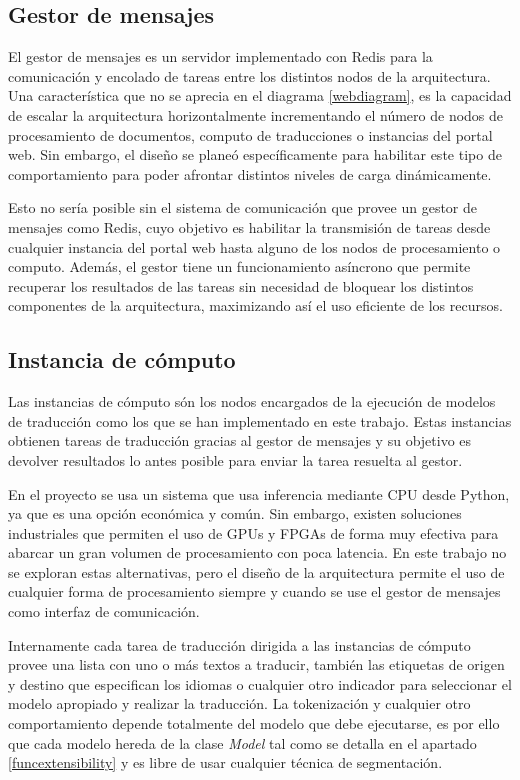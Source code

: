 \subsection{Gestor de mensajes}
El gestor de mensajes es un servidor implementado con Redis para la comunicación y encolado de tareas entre los distintos nodos de la arquitectura. Una característica que no se aprecia en el diagrama \ref{webdiagram}, es la capacidad de escalar la arquitectura horizontalmente incrementando el número de nodos de procesamiento de documentos, computo de traducciones o instancias del portal web. Sin embargo, el diseño se planeó específicamente para habilitar este tipo de comportamiento para poder afrontar distintos niveles de carga dinámicamente.

Esto no sería posible sin el sistema de comunicación que provee un gestor de mensajes como Redis, cuyo objetivo es habilitar la transmisión de tareas desde cualquier instancia del portal web hasta alguno de los nodos de procesamiento o computo. Además, el gestor tiene un funcionamiento asíncrono que permite recuperar los resultados de las tareas sin necesidad de bloquear los distintos componentes de la arquitectura, maximizando así el uso eficiente de los recursos.

\subsection{Instancia de cómputo}
Las instancias de cómputo són los nodos encargados de la ejecución de modelos de traducción como los que se han implementado en este trabajo. 
Estas instancias obtienen tareas de traducción gracias al gestor de mensajes y su objetivo es devolver resultados lo antes posible para enviar la tarea resuelta al gestor.

En el proyecto se usa un sistema que usa inferencia mediante CPU desde Python, ya que es una opción económica y común. Sin embargo, existen soluciones industriales que permiten el uso de GPUs y FPGAs de forma muy efectiva para abarcar un gran volumen de procesamiento con poca latencia. En este trabajo no se exploran estas alternativas, pero el diseño de la arquitectura permite el uso de cualquier forma de procesamiento siempre y cuando se use el gestor de mensajes como interfaz de comunicación.

Internamente cada tarea de traducción dirigida a las instancias de cómputo provee una lista con uno o más textos a traducir, también las etiquetas de origen y destino que especifican los idiomas o cualquier otro indicador para seleccionar el modelo apropiado y realizar la traducción.
La tokenización y cualquier otro comportamiento depende totalmente del modelo que debe ejecutarse, es por ello que cada modelo hereda de la clase \textit{Model} tal como se detalla en el apartado \ref{funcextensibility} y es libre de usar cualquier técnica de segmentación.

